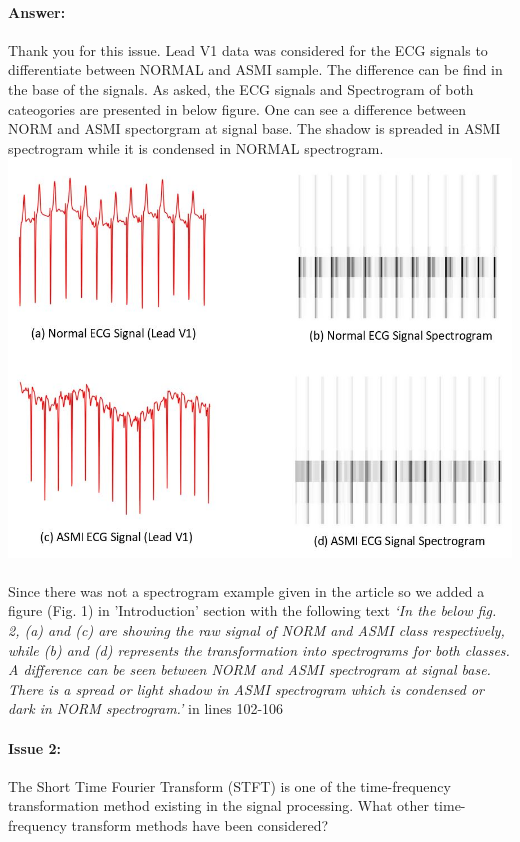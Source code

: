\documentclass{article}
\begin{document}
\paragraph{Answer:}
Thank you for this issue. Lead V1 data was considered for the ECG signals to differentiate between NORMAL and ASMI sample. The difference can be find in the base of the signals. As asked, the ECG signals and Spectrogram of both cateogories are presented in below figure. One can see a difference between NORM and ASMI spectorgram at signal base. The shadow is spreaded in ASMI spectrogram while it is condensed in NORMAL spectrogram. 
\includegraphics[scale=0.55]{Signal and spectrogram img.JPG}
\\\\
Since there was not a spectrogram example given in the article so we added a figure (Fig. 1) in 'Introduction' section with the following text \textit{`In the below fig. 2, (a) and (c) are showing the raw signal of NORM and ASMI class respectively, while (b) and (d) represents the transformation into spectrograms for both classes. A difference can be seen between NORM and ASMI spectrogram at signal base. There is a spread or light shadow in ASMI spectrogram which is condensed or dark in NORM spectrogram.'} in lines 102-106

\paragraph{Issue 2:}
\begin{displayquote}
 The Short Time Fourier Transform (STFT) is one of the time-frequency transformation method existing in the signal processing. What other time-frequency transform methods have been considered?
\end{displayquote}
\end{document}
